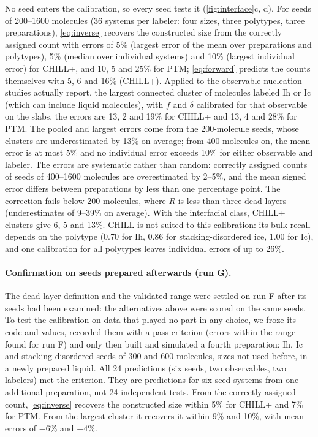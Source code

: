 \documentclass[11pt,a4paper]{article}
\begin{document}
No seed enters the calibration, so every seed tests it
(\cref{fig:interface}c, d). For seeds of 200--1600 molecules (36 systems per
labeler: four sizes, three polytypes, three preparations), \cref{eq:inverse}
recovers the constructed size from the correctly assigned count with errors
of 5\% (largest error of the mean over preparations and polytypes), 5\%
(median over individual systems) and 10\% (largest individual error) for
CHILL+, and 10, 5 and 25\% for PTM; \cref{eq:forward} predicts the counts
themselves with 5, 6 and 16\% (CHILL+). Applied to the observable nucleation
studies actually report, the largest connected cluster of molecules labeled
Ih or Ic (which can include liquid molecules), with $f$ and $\delta$
calibrated for that observable on the slabs, the errors are 13, 2 and 19\%
for CHILL+ and 13, 4 and 28\% for PTM. The pooled and largest errors come from
the 200-molecule seeds, whose clusters are underestimated by 13\% on
average; from 400 molecules on, the mean error is at most 5\% and no
individual error exceeds 10\% for either observable and labeler. The errors
are systematic rather than random: correctly assigned counts of seeds of
400--1600 molecules are overestimated by 2--5\%, and the mean signed error
differs between preparations by less than one percentage point. The
correction fails below 200 molecules, where $R$ is less than three dead
layers (underestimates of 9--39\% on average). With the interfacial class,
CHILL+ clusters give 6, 5 and 13\%. CHILL is not suited to this calibration:
its bulk recall depends on the polytype (0.70 for Ih, 0.86 for stacking-disordered ice, 1.00 for Ic), and one
calibration for all polytypes leaves individual errors of up to 26\%.

\paragraph{Confirmation on seeds prepared afterwards (run G).} The dead-layer
definition and the validated range were settled on run F after its seeds had
been examined: the alternatives above were scored on the same seeds. To test
the calibration on data that played no part in any choice, we froze its code
and values, recorded them with a pass criterion (errors within the range
found for run F) and only then built and simulated a fourth preparation:
Ih, Ic and stacking-disordered seeds of 300 and 600 molecules, sizes not used
before, in a newly prepared liquid. All 24 predictions (six seeds, two
observables, two labelers) met the criterion. They are predictions for six
seed systems from one additional preparation, not 24 independent tests.
From the correctly assigned count, \cref{eq:inverse} recovers the
constructed size within 5\% for CHILL+ and 7\% for PTM. From the largest
cluster it recovers it within 9\% and 10\%, with mean errors of $-6\%$ and $-4\%$.
\end{document}
